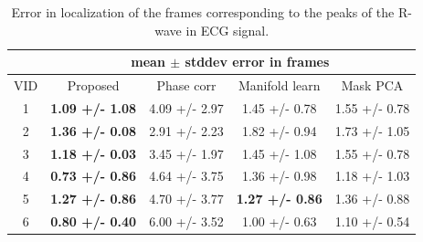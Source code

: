 \documentclass[journal]{IEEEtran}
\begin{document}
%	
\begin{table}[h]
\begin{minipage}[t]{0.95\linewidth}
\centering
\caption{Error in localization of the frames corresponding to the peaks of the R-wave in ECG signal.}
\setlength\tabcolsep{3pt} 
\begin{tabular}{|c|c|c|c|c|}
\hline
\multicolumn{1}{|l|}{} & \multicolumn{4}{c|}{mean $\pm$ stddev error in frames} \\ \hline
VID & Proposed & Phase corr\cite{Karadayi2006} & Manifold learn\cite{Wachinger2012} & Mask PCA\cite{Panayiotou2014} \\ \hline
1 & \bf{ 1.09 +/- 1.08 } & 4.09 +/- 2.97 & 1.45 +/- 0.78        & 1.55 +/- 0.78 \\ \hline
2 & \bf{ 1.36 +/- 0.08 } & 2.91 +/- 2.23 & 1.82 +/- 0.94        & 1.73 +/- 1.05 \\ \hline
3 & \bf{ 1.18 +/- 0.03 } & 3.45 +/- 1.97 & 1.45 +/- 1.08        & 1.55 +/- 0.78 \\ \hline
4 & \bf{ 0.73 +/- 0.86 } & 4.64 +/- 3.75 & 1.36 +/- 0.98        & 1.18 +/- 1.03 \\ \hline
5 & \bf{ 1.27 +/- 0.86 } & 4.70 +/- 3.77 & \bf{ 1.27 +/- 0.86 } & 1.36 +/- 0.88 \\ \hline
6 & \bf{ 0.80 +/- 0.40 } & 6.00 +/- 3.52 & 1.00 +/- 0.63        & 1.10 +/- 0.54 \\ \hline
\end{tabular}
\label{table:R_peak_localization}
\end{minipage}
\end{table}
%	
\end{document}
